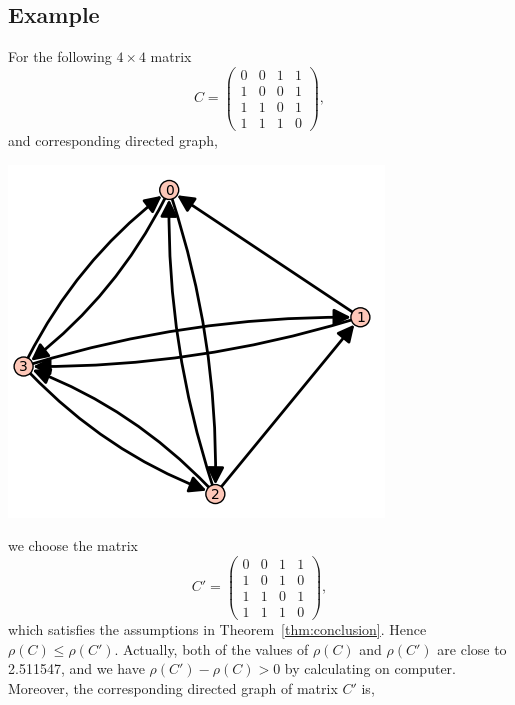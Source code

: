 \documentclass[12pt, a4paper]{article}
\theoremstyle{plain}
\theoremstyle{definition}
\begin{document}
\subsection{Example}
    For the following $4\times 4$ matrix
    $$C=\begin{pmatrix}
    0 & 0 & 1 & 1\\
    1 & 0 & 0 & 1\\
    1 & 1 & 0 & 1\\
    1 & 1 & 1 & 0
    \end{pmatrix},$$
    and corresponding directed graph, \cite[sage]{sage}
    \begin{center}
    \includegraphics{graph_C.PNG}
    \end{center}
    we choose the matrix
    $$C'=\begin{pmatrix}
    0 & 0 & 1 & 1\\
    1 & 0 & 1 & 0\\
    1 & 1 & 0 & 1\\
    1 & 1 & 1 & 0
    \end{pmatrix},$$
    which satisfies the assumptions in Theorem~\ref{thm:conclusion}. Hence $\rho(C)\leq\rho(C')$. Actually, both of the values of $\rho(C)$ and $\rho(C')$ are close to 2.511547, and we have $\rho(C')-\rho(C)>0$ by calculating on computer.
    Moreover, the corresponding directed graph of matrix $C'$ is, \cite[sage]{sage}
\end{document}
